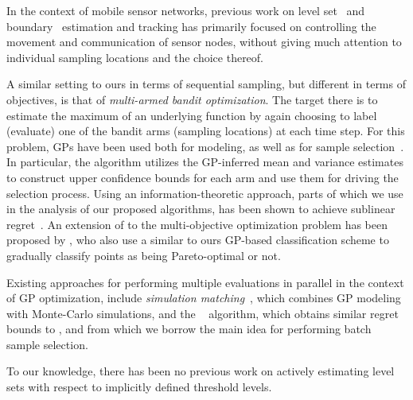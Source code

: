 In the context of mobile sensor networks, previous work on level
set~\cite{dantu07,srinivasan08} and boundary~\cite{singh06} estimation and
tracking has primarily focused on controlling the movement and
communication of sensor nodes, without giving much attention to
individual sampling locations and the choice thereof.

A similar setting to ours in terms of sequential sampling, but different
in terms of objectives, is that of \emph{multi-armed bandit optimization}.
The target there is to estimate the maximum of an underlying function
by again choosing to label (evaluate) one of the bandit arms (sampling
locations) at each time step. For this problem,
GPs have been used both for modeling, as well as for sample
selection~\mbox{\cite{brochu10}}. In particular, the \gpucb algorithm
utilizes the GP-inferred mean and variance estimates to construct upper
confidence bounds for each arm and use them for driving the selection
process. Using an information-theoretic approach, parts of which we use
in the analysis of our proposed algorithms, \gpucb has been shown
to achieve sublinear regret~\cite{srinivas10}.
An extension of \gpucb to the multi-objective optimization problem has
been proposed by \citet{zuluaga13}, who also use a similar to ours GP-based
classification scheme to gradually classify points as being
Pareto-optimal or not.

Existing approaches for performing multiple evaluations in
parallel in the context of GP optimization, include
\emph{simulation matching}~\cite{azimi10}, which combines GP modeling with
Monte-Carlo simulations, and the \gpbucb~\cite{desautels12} algorithm,
which obtains similar regret bounds to \gpucb, and from which we borrow
the main idea for performing batch sample selection.

To our knowledge, there has been no previous work on actively estimating
level sets with respect to implicitly defined threshold levels.